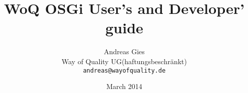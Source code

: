 \documentclass[11pt,a4paper,draft,titlepage,oneside,twoside]{report}
\title{WoQ OSGi User's and Developer' guide}
\author{Andreas Gies\\
  Way of Quality UG(haftungsbeschr\"{a}nkt)\\
  \texttt{andreas@wayofquality.de}}
\date{March 2014}
\begin{document}
\maketitle
\renewcommand{\abstractname}{Executive Summary}
\begin{abstract}
\end{abstract}
\end{document}
